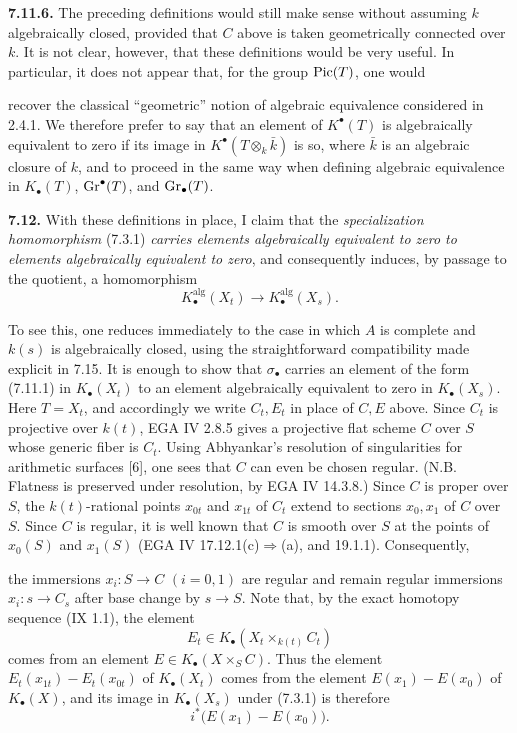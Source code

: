 \textbf{7.11.6.}
The preceding definitions would still make sense without assuming $k$
algebraically closed, provided that $C$ above is taken geometrically
connected over $k$. It is not clear, however, that these definitions would
be very useful. In particular, it does not appear that, for the group
$\operatorname{Pic}(T)$, one would

recover the classical ``geometric'' notion of algebraic equivalence
considered in 2.4.1. We therefore prefer to say that an element of
$K^\bullet(T)$ is algebraically equivalent to zero if its image in
$K^\bullet(T\otimes_k\bar k)$ is so, where $\bar k$ is an algebraic closure
of $k$, and to proceed in the same way when defining algebraic equivalence
in $K_\bullet(T)$, $\operatorname{Gr}^\bullet(T)$, and $\operatorname{Gr}_\bullet(T)$.

\textbf{7.12.}
With these definitions in place, I claim that the \emph{specialization homomorphism}
(7.3.1)
\emph{carries elements algebraically equivalent to zero to elements
algebraically equivalent to zero}, and consequently induces, by passage to
the quotient, a homomorphism
\begin{equation}\tag{7.12.1}
K_\bullet^{\mathrm{alg}}(X_t)
\longrightarrow K_\bullet^{\mathrm{alg}}(X_s).
\end{equation}

To see this, one reduces immediately to the case in which $A$ is complete
and $k(s)$ is algebraically closed, using the straightforward compatibility
made explicit in 7.15. It is enough to show that $\sigma_\bullet$ carries an
element of the form (7.11.1) in $K_\bullet(X_t)$ to an element algebraically
equivalent to zero in $K_\bullet(X_s)$. Here $T=X_t$, and accordingly we
write $C_t,E_t$ in place of $C,E$ above. Since $C_t$ is projective over
$k(t)$, EGA IV 2.8.5 gives a projective flat scheme $C$ over $S$ whose
generic fiber is $C_t$. Using Abhyankar's resolution of singularities for
arithmetic surfaces [6], one sees that $C$ can even be chosen regular.
(N.B. Flatness is preserved under resolution, by EGA IV 14.3.8.) Since $C$ is
proper over $S$, the $k(t)$-rational points $x_{0t}$ and $x_{1t}$ of $C_t$
extend to sections $x_0,x_1$ of $C$ over $S$. Since $C$ is regular, it is
well known that $C$ is smooth over $S$ at the points of $x_0(S)$ and
$x_1(S)$ (EGA IV 17.12.1(c)$\Rightarrow$(a), and 19.1.1). Consequently,

the immersions $x_i:S\to C$ $(i=0,1)$ are regular and remain regular
immersions $x_i:s\to C_s$ after base change by $s\to S$. Note that, by the
exact homotopy sequence (IX 1.1), the element
\[
E_t\in K_\bullet(X_t\times_{k(t)}C_t)
\]
comes from an element $E\in K_\bullet(X\times_SC)$. Thus the element
$E_t(x_{1t})-E_t(x_{0t})$ of $K_\bullet(X_t)$ comes from the element
$E(x_1)-E(x_0)$ of $K_\bullet(X)$, and its image in $K_\bullet(X_s)$ under
(7.3.1) is therefore
\[
i^*\bigl(E(x_1)-E(x_0)\bigr).
\tag{*}
\]

